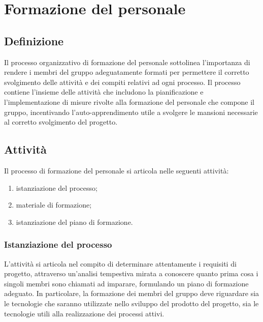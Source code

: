 \newpage

\section{Formazione del personale} \label{sec:formpers}
\subsection{Definizione}
Il processo organizzativo di formazione del personale sottolinea l'importanza di rendere i membri del gruppo adeguatamente formati per permettere il corretto svolgimento delle attività e dei compiti relativi ad ogni processo. Il processo contiene l'insieme delle attività che includono la pianificazione e l'implementazione di misure rivolte alla formazione del personale che compone il gruppo, incentivando l'auto-apprendimento utile a svolgere le mansioni necessarie al corretto svolgimento del progetto.
\subsection{Attività}
Il processo di formazione del personale si articola nelle seguenti attività:
\begin{enumerate}
    \item istanziazione del processo;
    \item materiale di formazione;
    \item istanziazione del piano di formazione.
\end{enumerate}
\subsubsection{Istanziazione del processo}
L'attività si articola nel compito di determinare attentamente i requisiti di progetto, attraverso un'analisi tempestiva mirata a conoscere quanto prima cosa i singoli membri sono chiamati ad imparare, formulando un piano di formazione adeguato. In particolare, la formazione dei membri del gruppo deve riguardare sia le tecnologie che saranno utilizzate nello sviluppo del prodotto del progetto, sia le tecnologie utili alla realizzazione dei processi attivi.

